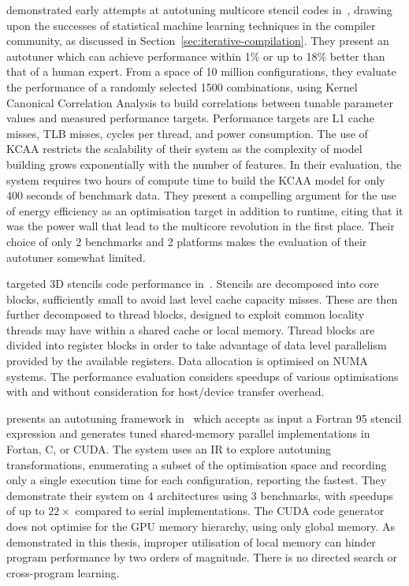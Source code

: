 \citeauthor{Ganapathi2009} demonstrated early attempts at autotuning
multicore stencil codes in~\cite{Ganapathi2009}, drawing upon the
successes of statistical machine learning techniques in the compiler
community, as discussed in
Section~\ref{sec:iterative-compilation}. They present an autotuner
which can achieve performance within 1\% or up to 18\% better than
that of a human expert. From a space of 10 million configurations,
they evaluate the performance of a randomly selected 1500
combinations, using Kernel Canonical Correlation Analysis to build
correlations between tunable parameter values and measured performance
targets. Performance targets are L1 cache misses, TLB misses, cycles
per thread, and power consumption. The use of KCAA restricts the
scalability of their system as the complexity of model building grows
exponentially with the number of features. In their evaluation, the
system requires two hours of compute time to build the KCAA model for
only 400 seconds of benchmark data. They present a compelling argument
for the use of energy efficiency as an optimisation target in addition
to runtime, citing that it was the power wall that lead to the
multicore revolution in the first place. Their choice of only 2
benchmarks and 2 platforms makes the evaluation of their autotuner
somewhat limited.

\citeauthor{Berkeley2009} targeted 3D stencils code performance
in~\cite{Berkeley2009}. Stencils are decomposed into core blocks,
sufficiently small to avoid last level cache capacity misses. These
are then further decomposed to thread blocks, designed to exploit
common locality threads may have within a shared cache or local
memory. Thread blocks are divided into register blocks in order to
take advantage of data level parallelism provided by the available
registers. Data allocation is optimised on NUMA systems. The
performance evaluation considers speedups of various optimisations
with and without consideration for host/device transfer overhead.

\citeauthor{Kamil2010} presents an autotuning framework
in~\cite{Kamil2010} which accepts as input a Fortran 95 stencil
expression and generates tuned shared-memory parallel implementations
in Fortan, C, or CUDA. The system uses an IR to explore autotuning
transformations, enumerating a subset of the optimisation space and
recording only a single execution time for each configuration,
reporting the fastest. They demonstrate their system on 4
architectures using 3 benchmarks, with speedups of up to $22\times$
compared to serial implementations. The CUDA code generator does not
optimise for the GPU memory hierarchy, using only global memory. As
demonstrated in this thesis, improper utilisation of local memory can
hinder program performance by two orders of magnitude. There is no
directed search or cross-program learning.

